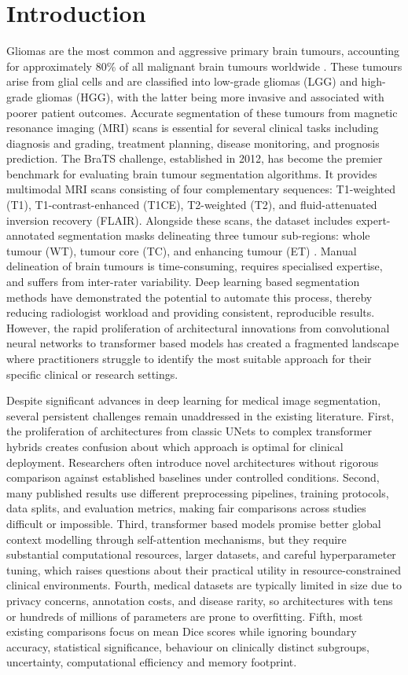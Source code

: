 \documentclass[final,3p,times,number]{elsarticle}
\begin{document}
\section{Introduction}

Gliomas are the most common and aggressive primary brain tumours, accounting for approximately 80\% of all malignant brain tumours worldwide \cite{ref5}. These tumours arise from glial cells and are classified into low-grade gliomas (LGG) and high-grade gliomas (HGG), with the latter being more invasive and associated with poorer patient outcomes. Accurate segmentation of these tumours from magnetic resonance imaging (MRI) scans is essential for several clinical tasks including diagnosis and grading, treatment planning, disease monitoring, and prognosis prediction. The BraTS challenge, established in 2012, has become the premier benchmark for evaluating brain tumour segmentation algorithms. It provides multimodal MRI scans consisting of four complementary sequences: T1-weighted (T1), T1-contrast-enhanced (T1CE), T2-weighted (T2), and fluid-attenuated inversion recovery (FLAIR). Alongside these scans, the dataset includes expert-annotated segmentation masks delineating three tumour sub-regions: whole tumour (WT), tumour core (TC), and enhancing tumour (ET) \cite{ref2}. Manual delineation of brain tumours is time-consuming, requires specialised expertise, and suffers from inter-rater variability. Deep learning based segmentation methods have demonstrated the potential to automate this process, thereby reducing radiologist workload and providing consistent, reproducible results. However, the rapid proliferation of architectural innovations from convolutional neural networks to transformer based models has created a fragmented landscape where practitioners struggle to identify the most suitable approach for their specific clinical or research settings.

Despite significant advances in deep learning for medical image segmentation, several persistent challenges remain unaddressed in the existing literature. First, the proliferation of architectures from classic UNets to complex transformer hybrids creates confusion about which approach is optimal for clinical deployment. Researchers often introduce novel architectures without rigorous comparison against established baselines under controlled conditions. Second, many published results use different preprocessing pipelines, training protocols, data splits, and evaluation metrics, making fair comparisons across studies difficult or impossible. Third, transformer based models promise better global context modelling through self-attention mechanisms, but they require substantial computational resources, larger datasets, and careful hyperparameter tuning, which raises questions about their practical utility in resource-constrained clinical environments. Fourth, medical datasets are typically limited in size due to privacy concerns, annotation costs, and disease rarity, so architectures with tens or hundreds of millions of parameters are prone to overfitting. Fifth, most existing comparisons focus on mean Dice scores while ignoring boundary accuracy, statistical significance, behaviour on clinically distinct subgroups, uncertainty, computational efficiency and memory footprint.
\end{document}
